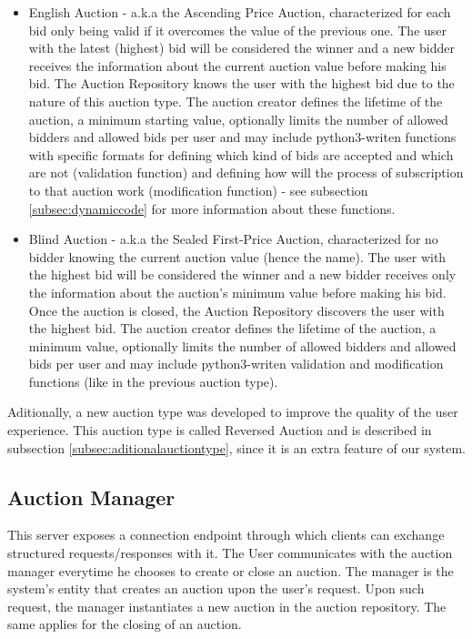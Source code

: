 \documentclass[a4paper]{article}
\begin{document}
\begin{itemize}
\item English Auction - a.k.a the Ascending Price Auction, characterized for each bid only being valid if it overcomes the value of the previous one. The user with the latest (highest) bid will be considered the winner and a new bidder receives the information about the current auction value before making his bid. The Auction Repository knows the user with the highest bid due to the nature of this auction type. The auction creator defines the lifetime of the auction, a minimum starting value, optionally limits the number of allowed bidders and allowed bids per user and may include python3-writen functions with specific formats for defining which kind of bids are accepted and which are not (validation function) and defining how will the process of subscription to that auction work (modification function) - see subsection \ref{subsec:dynamiccode} for more information about these functions. 
\item Blind Auction - a.k.a the Sealed First-Price Auction, characterized for no bidder knowing the current auction value (hence the name). The user with the highest bid will be considered the winner and a new bidder receives only the information about the auction's minimum value before making his bid. Once the auction is closed, the Auction Repository discovers the user with the highest bid. The auction creator defines the lifetime of the auction, a minimum value, optionally limits the number of allowed bidders and allowed bids per user and may include python3-writen validation and modification functions (like in the previous auction type). 
\end{itemize}

Aditionally, a new auction type was developed to improve the quality of the user experience. 
This auction type is called Reversed Auction and is described in subsection \ref{subsec:aditionalauctiontype}, since it is an extra feature of our system.

\subsection{Auction Manager}

This server exposes a connection endpoint through which clients can exchange structured requests/responses with it. 
The User communicates with the auction manager everytime he chooses to create or close an auction.
The manager is the system's entity that creates an auction upon the user's request. 
Upon such request, the manager instantiates a new auction in the auction repository. 
The same applies for the closing of an auction.
\end{document}
